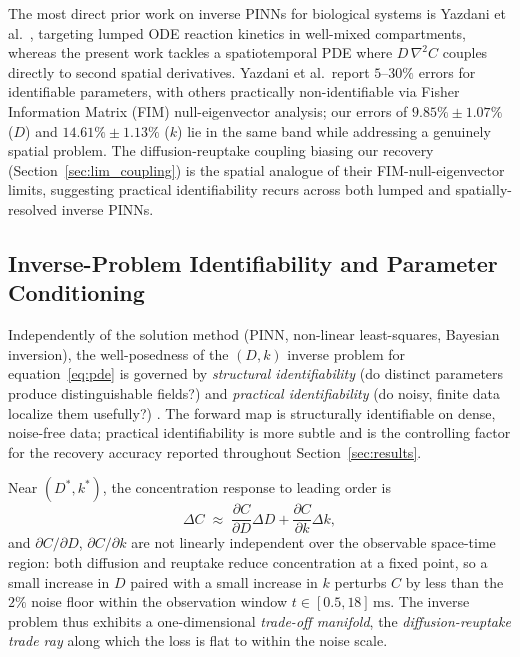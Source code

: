 \documentclass[pdflatex,sn-basic,Numbered]{sn-jnl}
\theoremstyle{thmstyleone}
\theoremstyle{thmstyletwo}
\begin{document}
The most direct prior work on inverse PINNs for biological
systems is Yazdani et al.~\cite{Yazdani2020}, targeting lumped
ODE reaction kinetics in well-mixed compartments, whereas the
present work tackles a spatiotemporal PDE where
$D\,\nabla^2 C$ couples directly to second spatial derivatives.
Yazdani et al.\ report $5$--$30\%$ errors for identifiable
parameters, with others practically non-identifiable via Fisher
Information Matrix (FIM) null-eigenvector analysis; our errors
of $9.85\% \pm 1.07\%$ ($D$) and $14.61\% \pm 1.13\%$ ($k$) lie
in the same band while addressing a genuinely spatial problem.
The diffusion-reuptake coupling biasing our recovery
(Section~\ref{sec:lim_coupling}) is the spatial analogue of
their FIM-null-eigenvector limits, suggesting practical
identifiability recurs across both lumped and spatially-resolved
inverse PINNs.

\subsection{Inverse-Problem Identifiability and Parameter Conditioning}
\label{sec:identifiability}

Independently of the solution method (PINN, non-linear
least-squares, Bayesian inversion), the well-posedness of the
$(D,k)$ inverse problem for equation~\eqref{eq:pde} is governed
by \emph{structural identifiability} (do distinct parameters
produce distinguishable fields?) and \emph{practical
identifiability} (do noisy, finite data localize them usefully?)
\cite{Yazdani2020}. The forward map is structurally identifiable
on dense, noise-free data; practical identifiability is more
subtle and is the controlling factor for the recovery accuracy
reported throughout Section~\ref{sec:results}.

Near $(D^*, k^*)$, the concentration response to leading order is
\begin{equation*}
  \Delta C \;\approx\; \frac{\partial C}{\partial D} \Delta D
                     + \frac{\partial C}{\partial k} \Delta k,
\end{equation*}
and $\partial C/\partial D$, $\partial C/\partial k$ are not
linearly independent over the observable space-time region: both
diffusion and reuptake reduce concentration at a fixed point, so
a small increase in $D$ paired with a small increase in $k$
perturbs $C$ by less than the $2\%$ noise floor within the
observation window $t \in [0.5, 18]\,\text{ms}$. The inverse
problem thus exhibits a one-dimensional \emph{trade-off
manifold},  the \emph{diffusion-reuptake trade ray}  along
which the loss is flat to within the noise scale.
\end{document}
